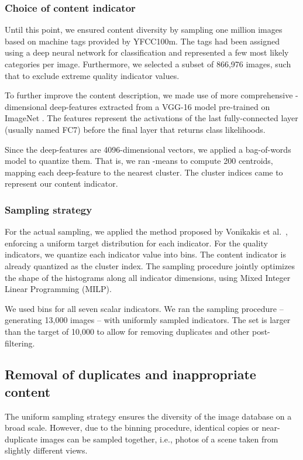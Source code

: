 \documentclass[10pt,journal,compsoc]{IEEEtran}
\begin{document}
\subsubsection{Choice of content indicator}

Until this point, we ensured content diversity by sampling one million images based on machine tags provided by YFCC100m. The tags had been assigned using a deep neural network for classification and represented a few most likely categories per image. Furthermore, we selected a subset of 866,976 images, such that to exclude extreme quality indicator values.

To further improve the content description, we made use of more comprehensive -dimensional deep-features extracted from a VGG-16 model pre-trained on ImageNet \cite{vgg}. The features represent the activations of the last fully-connected layer (usually named FC7) before the final layer that returns class likelihoods.

Since the deep-features are 4096-dimensional vectors, we applied a bag-of-words model to quantize them. That is, we ran -means to compute 200 centroids, mapping each deep-feature to the nearest cluster. The cluster indices came to represent our content indicator.

\subsubsection{Sampling strategy}

For the actual sampling, we applied the method proposed by Vonikakis et al.~\cite{vonikakis2016shaping}, enforcing a uniform target distribution for each indicator. For the quality indicators, we quantize each indicator value into  bins. The content indicator is already quantized as the cluster index. The sampling procedure jointly optimizes the shape of the histograms along all indicator dimensions, using Mixed Integer Linear Programming (MILP).

We used  bins for all seven scalar indicators. We ran the sampling procedure -- generating 13,000 images -- with uniformly sampled indicators. The set is larger than the target of 10,000 to allow for removing duplicates and other post-filtering.

\subsection{Removal of duplicates and inappropriate content}

The uniform sampling strategy ensures the diversity of the image database on a broad scale. However, due to the binning procedure, identical copies or near-duplicate images can be sampled together, i.e.,  photos of a scene taken from slightly different views. 
\end{document}
